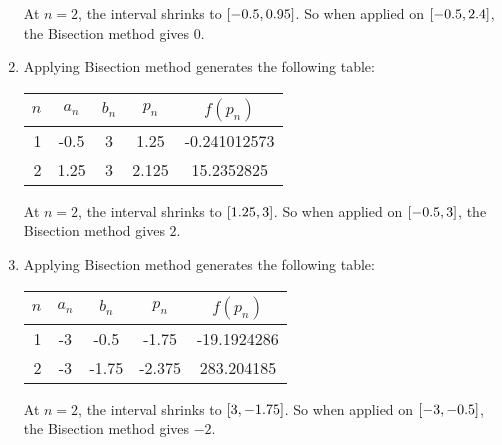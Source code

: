 \documentclass[../../Assignments.tex]{subfiles}
\begin{document}
\begin{solution}
\begin{enumerate}[label = (\alph*)]
            At \(n = 2\), the interval shrinks to
            \(\interval{\num{-0.5}}{\num{0.95}}\). So when applied on
            \(\interval{\num{-0.5}}{\num{2.4}}\), the Bisection method gives
            \(0\).

        \item Applying Bisection method generates the following table:

            \begin{table}[H]
                \centering
                \begin{tabular}{r S[table-format=-1.2] S[table-format=1] S[table-format=1.3] S[table-format=-1.9]}
                    \toprule
                    \(n\)  &   {\(a_n\)}   &   {\(b_n\)}   &   {\(p_n\)}   &  {\(f(p_n)\)}  \\
                      &  -0.5         &  3            &  1.25         &  -0.241012573  \\
                        2  &   1.25        &  3            &  2.125        &  15.2352825    \\
                    \bottomrule
                \end{tabular}
            \end{table}

            At \(n = 2\), the interval shrinks to \(\interval{\num{1.25}}{3}\).
            So when applied on \(\interval{\num{-0.5}}{3}\), the Bisection
            method gives \(2\).

        \item Applying Bisection method generates the following table:

            \begin{table}[H]
                \centering
                \begin{tabular}{r S[table-format=-1] S[table-format=-1.2] S[table-format=-1.3] S[table-format=-2.7]}
                    \toprule
                    \(n\)  &   {\(a_n\)}   &   {\(b_n\)}   &   {\(p_n\)}   &  {\(f(p_n)\)}  \\
                      &  -3           &  -0.5         &  -1.75        &  -19.1924286   \\
                        2  &  -3           &  -1.75        &  -2.375       &  283.204185    \\
                    \bottomrule
                \end{tabular}
            \end{table}

            At \(n = 2\), the interval shrinks to
            \(\interval{\-3}{\num{-1.75}}\). So when applied on
            \(\interval{-3}{\num{-0.5}}\), the Bisection method gives \(-2\).
    \end{enumerate}
\end{solution}
\end{document}
